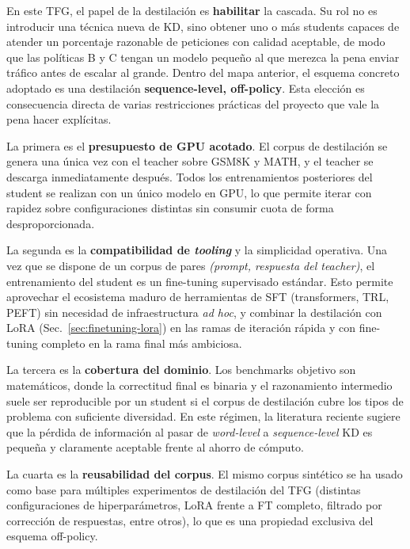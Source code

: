 \documentclass[11pt,a4paper]{article}
\begin{document}
En este TFG, el papel de la destilación es \textbf{habilitar} la cascada. Su rol no es introducir una técnica nueva de KD, sino obtener uno o más students capaces de atender un porcentaje razonable de peticiones con calidad aceptable, de modo que las políticas B y C tengan un modelo pequeño al que merezca la pena enviar tráfico antes de escalar al grande. Dentro del mapa anterior, el esquema concreto adoptado es una destilación \textbf{sequence-level, off-policy}. Esta elección es consecuencia directa de varias restricciones prácticas del proyecto que vale la pena hacer explícitas.

La primera es el \textbf{presupuesto de GPU acotado}. El corpus de destilación se genera una única vez con el teacher sobre GSM8K y MATH, y el teacher se descarga inmediatamente después. Todos los entrenamientos posteriores del student se realizan con un único modelo en GPU, lo que permite iterar con rapidez sobre configuraciones distintas sin consumir cuota de forma desproporcionada.

La segunda es la \textbf{compatibilidad de \textit{tooling}} y la simplicidad operativa. Una vez que se dispone de un corpus de pares \emph{(prompt, respuesta del teacher)}, el entrenamiento del student es un fine-tuning supervisado estándar. Esto permite aprovechar el ecosistema maduro de herramientas de SFT (transformers, TRL, PEFT) sin necesidad de infraestructura \textit{ad hoc}, y combinar la destilación con LoRA (Sec.~\ref{sec:finetuning-lora}) en las ramas de iteración rápida y con fine-tuning completo en la rama final más ambiciosa.

La tercera es la \textbf{cobertura del dominio}. Los benchmarks objetivo son matemáticos, donde la correctitud final es binaria y el razonamiento intermedio suele ser reproducible por un student si el corpus de destilación cubre los tipos de problema con suficiente diversidad. En este régimen, la literatura reciente sugiere que la pérdida de información al pasar de \emph{word-level} a \emph{sequence-level} KD es pequeña y claramente aceptable frente al ahorro de cómputo.

La cuarta es la \textbf{reusabilidad del corpus}. El mismo corpus sintético se ha usado como base para múltiples experimentos de destilación del TFG (distintas configuraciones de hiperparámetros, LoRA frente a FT completo, filtrado por corrección de respuestas, entre otros), lo que es una propiedad exclusiva del esquema off-policy.
\end{document}
